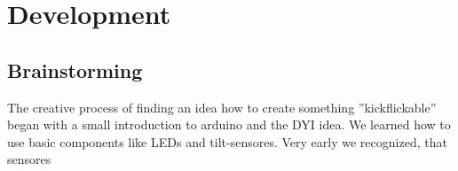 \section{Development}

\subsection{Brainstorming}
The creative process of finding an idea how to create something ''kickflickable'' began with a small introduction to arduino and the DYI %
idea. We learned how to use basic components like LEDs and tilt-sensores. Very early we recognized, that sensores 

